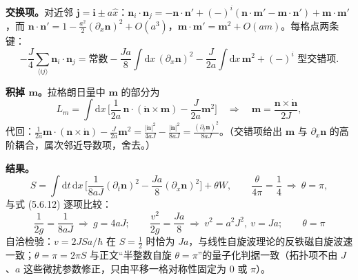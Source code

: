 \textbf{交换项。}对近邻 $\pmb j=\pmb i\pm a\hat x$：$\pmb n_i\cdot\pmb n_j=-\pmb n\cdot\pmb n'+(-)^{i}(\pmb n\cdot\pmb m'-\pmb m\cdot\pmb n')+\pmb m\cdot\pmb m'$，而 $\pmb n\cdot\pmb n'=1-\frac{a^{2}}{2}(\partial_x\pmb n)^{2}+O(a^{3})$，$\pmb m\cdot\pmb m'=\pmb m^{2}+O(am)$。每格点两条键：
\begin{equation*}
-\frac{J}{4}\sum_{\langle ij\rangle}\pmb n_i\cdot\pmb n_j
=\text{常数}-\frac{Ja}{8}\int\mathrm{d}x\,(\partial_x\pmb n)^{2}
-\frac{J}{2a}\int\mathrm{d}x\,\pmb m^{2}
+(-)^{i}\text{ 型交错项} .
\end{equation*}

\textbf{积掉 $\pmb m$。}拉格朗日量中 $\pmb m$ 的部分为
\begin{equation*}
L_m=\int\mathrm{d}x\,\Big[\frac{1}{2a}\,\pmb n\cdot(\dot{\pmb n}\times\pmb m)-\frac{J}{2a}\pmb m^{2}\Big]
\quad\Longrightarrow\quad
\pmb m=\frac{\pmb n\times\dot{\pmb n}}{2J} ,
\end{equation*}
代回：$\frac{1}{2a}\pmb m\cdot(\pmb n\times\dot{\pmb n})-\frac{J}{2a}\pmb m^{2}=\frac{|\dot{\pmb n}|^{2}}{4aJ}-\frac{|\dot{\pmb n}|^{2}}{8aJ}=\frac{(\partial_t\pmb n)^{2}}{8aJ}$。（交错项给出 $\pmb m$ 与 $\partial_x\pmb n$ 的高阶耦合，属次邻近导数项，舍去。）

\textbf{结果。}
\begin{equation*}
S=\int\mathrm{d}t\,\mathrm{d}x\,\Big[\frac{1}{8aJ}(\partial_t\pmb n)^{2}-\frac{Ja}{8}(\partial_x\pmb n)^{2}\Big]+\theta W ,
\qquad
\frac{\theta}{4\pi}=\frac14\ \Longrightarrow\ \theta=\pi ,
\end{equation*}
与式 (5.6.12) 逐项比较：
\begin{equation*}
\boxed{\;\frac{1}{2g}=\frac{1}{8aJ}\ \Longrightarrow\ g=4aJ;\qquad
\frac{v^{2}}{2g}=\frac{Ja}{8}\ \Longrightarrow\ v^{2}=a^{2}J^{2},\ v=Ja;\qquad \theta=\pi\;}
\end{equation*}
自洽检验：$v=2JSa/\hbar$ 在 $S=\frac12$ 时恰为 $Ja$，与线性自旋波理论的反铁磁自旋波速一致；$\theta=\pi=2\pi S$ 与正文“半整数自旋 $\theta=\pi$”的量子化判据一致（拓扑项不由 $J$、$a$ 这些微扰参数修正，只由平移一格对称性固定为 0 或 $\pi$）。
